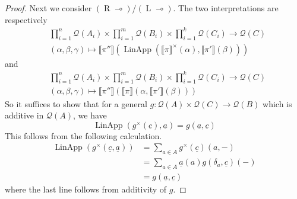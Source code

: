 \documentclass[12pt]{article}
\theoremstyle{plain}
\theoremstyle{definition}
\newcommand{\call}[1]{\mathcal{#1}}
\newcommand{\lto}{\longrightarrow}
\begin{document}
\begin{proof}
Next we consider $(\operatorname{R}\multimap)$/$(\operatorname{L}\multimap)$. The two interpretations are respectively
\begin{align*}
&\prod_{i = 1}^n \call{Q}(A_i) \times \prod_{i = 1}^m \call{Q}(B_i) \times \prod_{i = 1}^k \call{Q}(C_i) \lto \call{Q}(C)\\
&(\alpha, \beta, \gamma) \longmapsto \llbracket \pi''\rrbracket(\operatorname{LinApp}(\llbracket \pi \rrbracket^\times(\alpha), \llbracket \pi'\rrbracket(\beta)))
\end{align*}
and
\begin{align*}
&\prod_{i = 1}^n \call{Q}(A_i) \times \prod_{i = 1}^m \call{Q}(B_i) \times \prod_{i = 1}^k \call{Q}(C_i) \lto \call{Q}(C)\\
&(\alpha, \beta, \gamma) \longmapsto \llbracket \pi'' \rrbracket(\llbracket \pi\rrbracket(\alpha, \llbracket \pi'\rrbracket(\beta)))
\end{align*}
So it suffices to show that for a general $g: \call{Q}(A) \times \call{Q}(C) \lto \call{Q}(B)$ which is additive in $\call{Q}(A)$, we have
\begin{equation}
\operatorname{LinApp}(g^\times(\underline{c}), \underline{a}) = g(\underline{a}, \underline{c})
\end{equation}
This follows from the following calculation.
\begin{align*}
\operatorname{LinApp}(g^\times(\underline{c}, \underline{a})) &= \sum_{a \in A}g^\times(\underline{c})(a, -)\\
&= \sum_{a \in A}\underline{a}(a)g(\delta_{a}, \underline{c})(-)\\
&= g(\underline{a}, \underline{c})
\end{align*}
where the last line follows from additivity of $g$.
\end{proof}



















	
\end{document}
